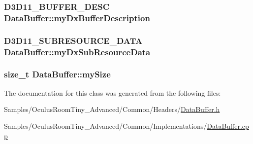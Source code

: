 \subsubsection[{\texorpdfstring{my\+Dx\+Buffer\+Description}{myDxBufferDescription}}]{\setlength{\rightskip}{0pt plus 5cm}D3\+D11\+\_\+\+B\+U\+F\+F\+E\+R\+\_\+\+D\+E\+SC Data\+Buffer\+::my\+Dx\+Buffer\+Description\hspace{0.3cm}{\ttfamily [protected]}}\hypertarget{class_data_buffer_aca633d446c9c237966a06baca5df245d}{}\label{class_data_buffer_aca633d446c9c237966a06baca5df245d}
\subsubsection[{\texorpdfstring{my\+Dx\+Sub\+Resource\+Data}{myDxSubResourceData}}]{\setlength{\rightskip}{0pt plus 5cm}D3\+D11\+\_\+\+S\+U\+B\+R\+E\+S\+O\+U\+R\+C\+E\+\_\+\+D\+A\+TA Data\+Buffer\+::my\+Dx\+Sub\+Resource\+Data\hspace{0.3cm}{\ttfamily [protected]}}\hypertarget{class_data_buffer_a20ae63eb53988ea2963b45a307615d39}{}\label{class_data_buffer_a20ae63eb53988ea2963b45a307615d39}
\subsubsection[{\texorpdfstring{my\+Size}{mySize}}]{\setlength{\rightskip}{0pt plus 5cm}size\+\_\+t Data\+Buffer\+::my\+Size\hspace{0.3cm}{\ttfamily [protected]}}\hypertarget{class_data_buffer_a31bb760d7d272d637e387b37d7caecfe}{}\label{class_data_buffer_a31bb760d7d272d637e387b37d7caecfe}


The documentation for this class was generated from the following files\+:\begin{DoxyCompactItemize}
\item 
Samples/\+Oculus\+Room\+Tiny\+\_\+\+Advanced/\+Common/\+Headers/\hyperlink{_data_buffer_8h}{Data\+Buffer.\+h}\item 
Samples/\+Oculus\+Room\+Tiny\+\_\+\+Advanced/\+Common/\+Implementations/\hyperlink{_data_buffer_8cpp}{Data\+Buffer.\+cpp}\end{DoxyCompactItemize}
